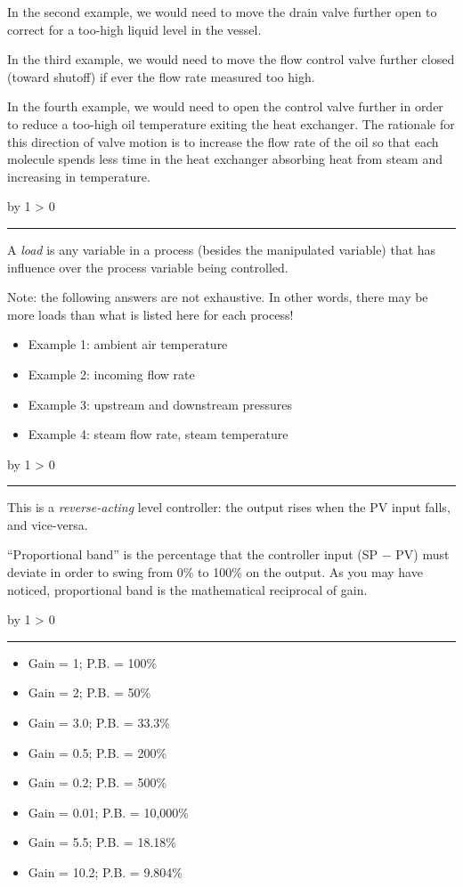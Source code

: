 \documentclass[12pt,a4paper]{article}
\def\svar{
           \advance\answnum by 1
           \ifnum \answnum > 0
                \hrule
                \vskip 3pt
                \leftline{Svar \the\answnum}
                \vskip 3pt \fi}
\begin{document}
\vskip 10pt

In the second example, we would need to move the drain valve further open to correct for a too-high liquid level in the vessel.

\vskip 10pt

In the third example, we would need to move the flow control valve further closed (toward shutoff) if ever the flow rate measured too high.

\vskip 10pt

In the fourth example, we would need to open the control valve further in order to reduce a too-high oil temperature exiting the heat exchanger.  The rationale for this direction of valve motion is to increase the flow rate of the oil so that each molecule spends less time in the heat exchanger absorbing heat from steam and increasing in temperature.

\vskip 10pt \filbreak 
\svar{} 

A {\it load} is any variable in a process (besides the manipulated variable) that has influence over the process variable being controlled.

\vskip 10pt

Note: the following answers are not exhaustive.  In other words, there may be more loads than what is listed here for each process!

\begin{itemize}
\item{} Example 1: ambient air temperature
\item{} Example 2: incoming flow rate
\item{} Example 3: upstream and downstream pressures
\item{} Example 4: steam flow rate, steam temperature
\end{itemize}

\vskip 10pt \filbreak 
\svar{} 

This is a {\it reverse-acting} level controller: the output rises when the PV input falls, and vice-versa.

\vskip 10pt

``Proportional band'' is the percentage that the controller input (SP $-$ PV) must deviate in order to swing from 0\% to 100\% on the output.  As you may have noticed, proportional band is the mathematical reciprocal of gain.

\vskip 10pt \filbreak 
\svar{} 

\begin{itemize}
\item{}Gain = 1; P.B. = 100\%
\vskip 5pt
\item{}Gain = 2; P.B. = 50\%
\vskip 5pt
\item{}Gain = 3.0; P.B. = 33.3\%
\vskip 5pt
\item{}Gain = 0.5; P.B. = 200\%
\vskip 5pt
\item{}Gain = 0.2; P.B. = 500\%
\vskip 5pt
\item{}Gain = 0.01; P.B. = 10,000\%
\vskip 5pt
\item{}Gain = 5.5; P.B. = 18.18\%
\vskip 5pt
\item{}Gain = 10.2; P.B. = 9.804\%
\end{itemize} 
\end{document}
